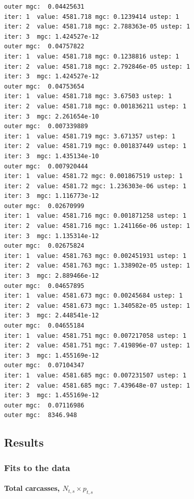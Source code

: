 \documentclass[
  letterpaper,
  DIV=11,
  numbers=noendperiod]{scrartcl}
\let\oldparagraph\paragraph
\renewcommand{\paragraph}[1]{\oldparagraph{#1}\mbox{}}
\begin{document}
\begin{verbatim}
outer mgc:  0.04425631 
iter: 1  value: 4581.718 mgc: 0.1239414 ustep: 1 
iter: 2  value: 4581.718 mgc: 2.788363e-05 ustep: 1 
iter: 3  mgc: 1.424527e-12 
outer mgc:  0.04757822 
iter: 1  value: 4581.718 mgc: 0.1238816 ustep: 1 
iter: 2  value: 4581.718 mgc: 2.792846e-05 ustep: 1 
iter: 3  mgc: 1.424527e-12 
outer mgc:  0.04753654 
iter: 1  value: 4581.718 mgc: 3.67503 ustep: 1 
iter: 2  value: 4581.718 mgc: 0.001836211 ustep: 1 
iter: 3  mgc: 2.261654e-10 
outer mgc:  0.007339889 
iter: 1  value: 4581.719 mgc: 3.671357 ustep: 1 
iter: 2  value: 4581.719 mgc: 0.001837449 ustep: 1 
iter: 3  mgc: 1.435134e-10 
outer mgc:  0.007920444 
iter: 1  value: 4581.72 mgc: 0.001867519 ustep: 1 
iter: 2  value: 4581.72 mgc: 1.236303e-06 ustep: 1 
iter: 3  mgc: 1.116773e-12 
outer mgc:  0.02670999 
iter: 1  value: 4581.716 mgc: 0.001871258 ustep: 1 
iter: 2  value: 4581.716 mgc: 1.241166e-06 ustep: 1 
iter: 3  mgc: 1.135314e-12 
outer mgc:  0.02675824 
iter: 1  value: 4581.763 mgc: 0.002451931 ustep: 1 
iter: 2  value: 4581.763 mgc: 1.338902e-05 ustep: 1 
iter: 3  mgc: 2.889466e-12 
outer mgc:  0.04657895 
iter: 1  value: 4581.673 mgc: 0.00245684 ustep: 1 
iter: 2  value: 4581.673 mgc: 1.340582e-05 ustep: 1 
iter: 3  mgc: 2.448541e-12 
outer mgc:  0.04655184 
iter: 1  value: 4581.751 mgc: 0.007217058 ustep: 1 
iter: 2  value: 4581.751 mgc: 7.419896e-07 ustep: 1 
iter: 3  mgc: 1.455169e-12 
outer mgc:  0.07104347 
iter: 1  value: 4581.685 mgc: 0.007231507 ustep: 1 
iter: 2  value: 4581.685 mgc: 7.439648e-07 ustep: 1 
iter: 3  mgc: 1.455169e-12 
outer mgc:  0.07116986 
outer mgc:  8346.948 
\end{verbatim}

\hypertarget{results}{%
\subsection{Results}\label{results}}

\hypertarget{fits-to-the-data}{%
\subsubsection{Fits to the data}\label{fits-to-the-data}}

\hypertarget{total-carcasses-n_ts-times-p_ts}{%
\paragraph{\texorpdfstring{Total carcasses,
\(N_{t,s} \times p_{t,s}\)}{Total carcasses, N\_\{t,s\} \textbackslash times p\_\{t,s\}}}\label{total-carcasses-n_ts-times-p_ts}}
\end{document}
